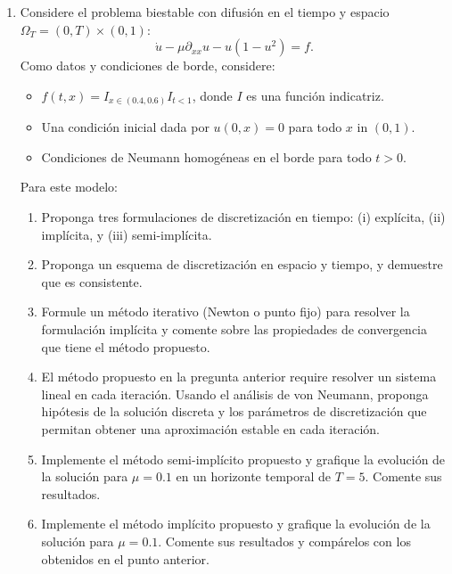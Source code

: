 \documentclass{article}
\newcommand{\pts}[1]{[{\bf #1 puntos}] }
\begin{document}
\begin{enumerate}
    \item Considere el problema biestable con difusión en el tiempo y espacio $\Omega_T = (0,T)\times (0,1)$:
            $$ \dot u - \mu \partial_{xx} u - u(1-u^2) = f. $$
            Como datos y condiciones de borde, considere:
            \begin{itemize}
                \item $f(t,x) = I_{x\in (0.4,0.6)}I_{t<1}$, donde $I$ es una función indicatriz.
                \item Una condición inicial dada por $u(0,x) = 0$ para todo $x$ in $(0,1)$. 
                \item Condiciones de Neumann homogéneas en el borde para todo $t>0$. 
            \end{itemize}
            Para este modelo:
            \begin{enumerate}
                \item\pts{1} Proponga tres formulaciones de discretización en tiempo: (i) explícita, (ii) implícita, y (iii) semi-implícita. 
                \item\pts{1} Proponga un esquema de discretización en espacio y tiempo, y demuestre que es consistente.
                \item\pts{1} Formule un método iterativo (Newton o punto fijo) para resolver la formulación implícita y comente sobre las propiedades de convergencia que tiene el método propuesto. 
                \item\pts{1} El método propuesto en la pregunta anterior require resolver un sistema lineal en cada iteración. Usando el análisis de von Neumann, proponga hipótesis de la solución discreta y los parámetros de discretización que permitan obtener una aproximación estable en cada iteración.
                \item\pts{2} Implemente el método semi-implícito propuesto y grafique la evolución de la solución para $\mu=0.1$ en un horizonte temporal de $T=5$. Comente sus resultados.
                \item\pts{3} Implemente el método implícito propuesto y grafique la evolución de la solución para $\mu=0.1$. Comente sus resultados y compárelos con los obtenidos en el punto anterior.
            \end{enumerate}


\end{enumerate}
\end{document}
